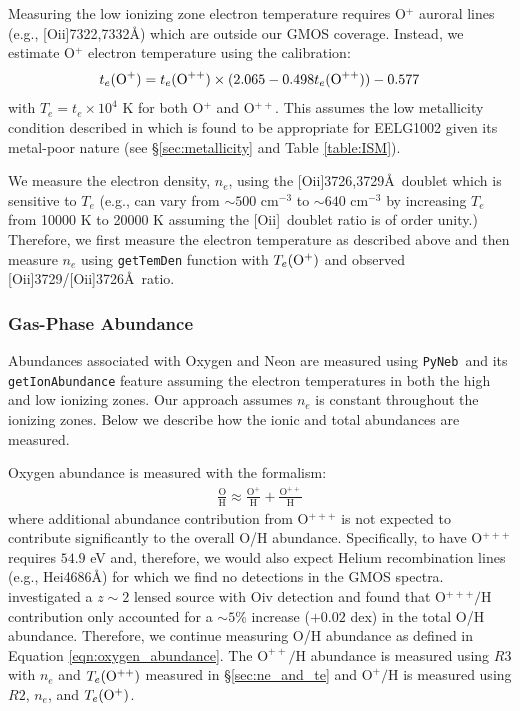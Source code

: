 \documentclass[twocolumn,tight,times,linenumbers]{aastex631}
\newcommand{\oii}{[O{\sc ii}]}
\newcommand{\pyneb}{\texttt{PyNeb}}
\begin{document}
		Measuring the low ionizing zone electron temperature requires O$^+$ auroral lines (e.g., \oii7322,7332\AA) which are outside our GMOS coverage. Instead, we estimate O$^+$ electron temperature using the \citet{Izotov2006} calibration:
		\begin{eqnarray}
			\centering
			t_e(\textrm{O}^+) = t_e(\textrm{O}^{++}) \times (2.065 - 0.498 t_e(\textrm{O}^{++}))  - 0.577
		\end{eqnarray}
		with $T_e  = t_e\times 10^4$ K for both O$^+$ and O$^{++}$. This assumes the low metallicity condition described in \citet{Izotov2006} which is found to be appropriate for EELG1002 given its metal-poor nature (see \S\ref{sec:metallicity} and Table \ref{table:ISM}).

		We measure the electron density, $n_e$, using the \oii3726,3729\AA~doublet which is sensitive to $T_e$ (e.g., can vary from $\sim 500$ cm$^{-3}$ to $\sim 640$ cm$^{-3}$ by increasing $T_e$ from 10000 K to 20000 K assuming the \oii~doublet ratio is of order unity.) Therefore, we first measure the electron temperature as described above and then measure $n_e$ using \texttt{getTemDen} function with  $T_e(\rm{O}^{+})$ and observed \oii3729/\oii3726\AA~ratio.

		
		\subsubsection{Gas-Phase Abundance}
		\label{sec:abundances}
		Abundances associated with Oxygen and Neon are measured using \pyneb~and its \texttt{getIonAbundance} feature assuming the electron temperatures in both the high and low ionizing zones. Our approach assumes $n_e$ is constant throughout the ionizing zones. Below we describe how the ionic and total abundances are measured.
		
		Oxygen abundance is measured with the formalism:
		\begin{eqnarray}
			\frac{\textrm{O}}{\textrm{H}} \approx \frac{\textrm{O}^+}{\textrm{H}}  + \frac{\textrm{O}^{++}}{\textrm{H}} 
			\label{eqn:oxygen_abundance}
		\end{eqnarray}
		where additional abundance contribution from O$^{+++}$ is not expected to contribute significantly to the overall O/H abundance. Specifically, to have O$^{+++}$ requires $54.9$ eV and, therefore, we would also expect Helium recombination lines (e.g., He{\sc i}4686\AA) for which we find no detections in the GMOS spectra. \cite{Berg2018} investigated a $z \sim 2$ lensed source with O{\sc iv} detection and found that O$^{+++}/$H contribution only accounted for a $\sim 5$\% increase ($+0.02$ dex) in the total O/H abundance. Therefore, we continue measuring O/H abundance as defined in Equation \ref{eqn:oxygen_abundance}. The $\textrm{O}^{++}/\textrm{H}$ abundance is measured using $R3$ with $n_e$ and $T_e(\rm{O}^{++})$ measured in \S\ref{sec:ne_and_te} and $\textrm{O}^{+}/\textrm{H}$ is measured using $R2$, $n_e$, and $T_e(\rm{O}^{+})$. %
\end{document}
